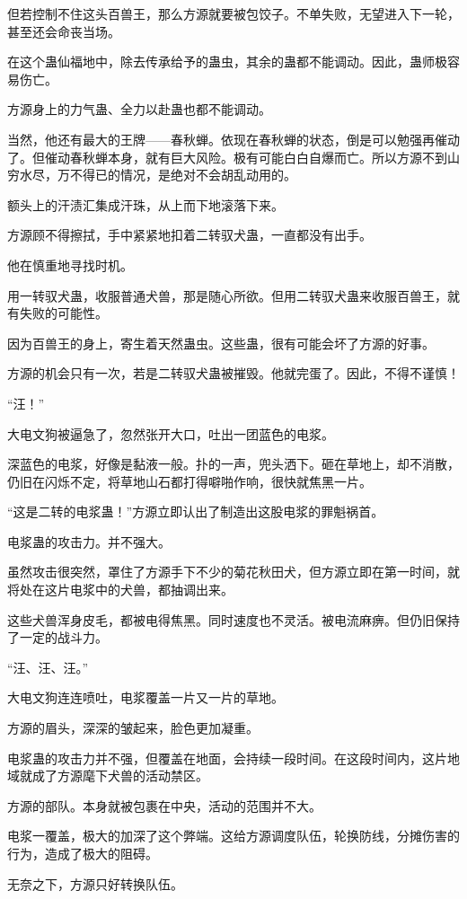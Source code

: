 \begin{this_body}
但若控制不住这头百兽王，那么方源就要被包饺子。不单失败，无望进入下一轮，甚至还会命丧当场。

在这个蛊仙福地中，除去传承给予的蛊虫，其余的蛊都不能调动。因此，蛊师极容易伤亡。

方源身上的力气蛊、全力以赴蛊也都不能调动。

当然，他还有最大的王牌——春秋蝉。依现在春秋蝉的状态，倒是可以勉强再催动了。但催动春秋蝉本身，就有巨大风险。极有可能白白自爆而亡。所以方源不到山穷水尽，万不得已的情况，是绝对不会胡乱动用的。

额头上的汗渍汇集成汗珠，从上而下地滚落下来。

方源顾不得擦拭，手中紧紧地扣着二转驭犬蛊，一直都没有出手。

他在慎重地寻找时机。

用一转驭犬蛊，收服普通犬兽，那是随心所欲。但用二转驭犬蛊来收服百兽王，就有失败的可能性。

因为百兽王的身上，寄生着天然蛊虫。这些蛊，很有可能会坏了方源的好事。

方源的机会只有一次，若是二转驭犬蛊被摧毁。他就完蛋了。因此，不得不谨慎！

“汪！”

大电文狗被逼急了，忽然张开大口，吐出一团蓝色的电浆。

深蓝色的电浆，好像是黏液一般。扑的一声，兜头洒下。砸在草地上，却不消散，仍旧在闪烁不定，将草地山石都打得噼啪作响，很快就焦黑一片。

“这是二转的电浆蛊！”方源立即认出了制造出这股电浆的罪魁祸首。

电浆蛊的攻击力。并不强大。

虽然攻击很突然，罩住了方源手下不少的菊花秋田犬，但方源立即在第一时间，就将处在这片电浆中的犬兽，都抽调出来。

这些犬兽浑身皮毛，都被电得焦黑。同时速度也不灵活。被电流麻痹。但仍旧保持了一定的战斗力。

“汪、汪、汪。”

大电文狗连连喷吐，电浆覆盖一片又一片的草地。

方源的眉头，深深的皱起来，脸色更加凝重。

电浆蛊的攻击力并不强，但覆盖在地面，会持续一段时间。在这段时间内，这片地域就成了方源麾下犬兽的活动禁区。

方源的部队。本身就被包裹在中央，活动的范围并不大。

电浆一覆盖，极大的加深了这个弊端。这给方源调度队伍，轮换防线，分摊伤害的行为，造成了极大的阻碍。

无奈之下，方源只好转换队伍。


\end{this_body}

